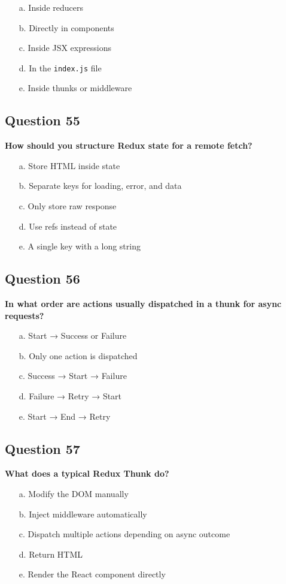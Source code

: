 \documentclass{article}
\begin{document}
\begin{itemize}
  \item[a.] Inside reducers
  \item[b.] Directly in components
  \item[c.] Inside JSX expressions
  \item[d.] In the \texttt{index.js} file
  \item[e.] Inside thunks or middleware
\end{itemize}

\subsection*{Question 55}
\textbf{How should you structure Redux state for a remote fetch?}

\begin{itemize}
  \item[a.] Store HTML inside state
  \item[b.] Separate keys for loading, error, and data
  \item[c.] Only store raw response
  \item[d.] Use refs instead of state
  \item[e.] A single key with a long string
\end{itemize}

\subsection*{Question 56}
\textbf{In what order are actions usually dispatched in a thunk for async requests?}

\begin{itemize}
  \item[a.] Start → Success or Failure
  \item[b.] Only one action is dispatched
  \item[c.] Success → Start → Failure
  \item[d.] Failure → Retry → Start
  \item[e.] Start → End → Retry
\end{itemize}

\subsection*{Question 57}
\textbf{What does a typical Redux Thunk do?}

\begin{itemize}
  \item[a.] Modify the DOM manually
  \item[b.] Inject middleware automatically
  \item[c.] Dispatch multiple actions depending on async outcome
  \item[d.] Return HTML
  \item[e.] Render the React component directly
\end{itemize}
\end{document}
